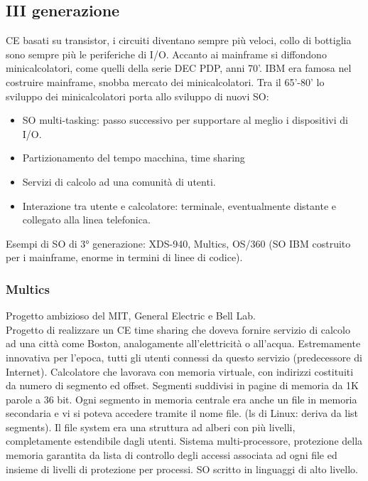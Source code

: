 \documentclass[12pt, oneside]{extbook}
\begin{document}
\subsection{III generazione}
CE basati su transistor, i circuiti diventano sempre più veloci, collo di bottiglia sono sempre più le periferiche di I/O. Accanto ai mainframe si diffondono minicalcolatori, come quelli della serie DEC PDP, anni 70'. IBM era famosa nel costruire mainframe, snobba mercato dei minicalcolatori. Tra il 65'-80' lo sviluppo dei minicalcolatori porta allo sviluppo di nuovi SO:
\begin{itemize}
\item SO multi-tasking: passo successivo per supportare al meglio i dispositivi di I/O.
\item Partizionamento del tempo macchina, time sharing
\item Servizi di calcolo ad una comunità di utenti.
\item Interazione tra utente e calcolatore: terminale, eventualmente distante e collegato alla linea telefonica.
\end{itemize}
Esempi di SO di 3° generazione: XDS-940, Multics, OS/360 (SO IBM costruito per i mainframe, enorme in termini di linee di codice).
\subsubsection{Multics}
Progetto ambizioso del MIT, General Electric e Bell Lab.\\ Progetto di realizzare un CE time sharing che doveva fornire servizio di calcolo ad una città come Boston, analogamente all'elettricità o all'acqua. Estremamente innovativa per l'epoca, tutti gli utenti connessi da questo servizio (predecessore di Internet). Calcolatore che lavorava con memoria virtuale, con indirizzi costituiti da numero di segmento ed offset. Segmenti suddivisi in pagine di memoria da 1K parole a 36 bit. Ogni segmento in memoria centrale era anche un file in memoria secondaria e vi si poteva accedere tramite il nome file. (ls di Linux: deriva da list segments). Il file system era una struttura ad alberi con più livelli, completamente estendibile dagli utenti. Sistema multi-processore, protezione della memoria garantita da lista di controllo degli accessi associata ad ogni file ed insieme di livelli di protezione per processi. SO scritto in linguaggi di alto livello.
\end{document}
